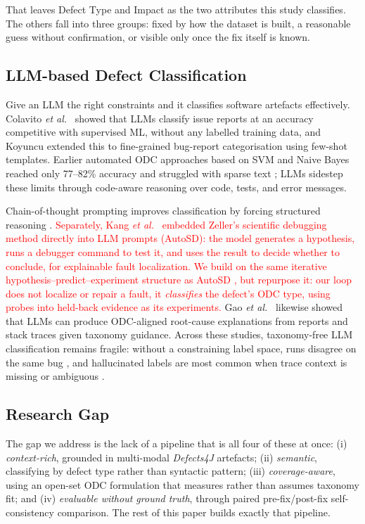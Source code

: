 That leaves Defect Type and Impact as the two attributes this study
classifies. The others fall into three groups: fixed by how the dataset is
built, a reasonable guess without confirmation, or visible only once the
fix itself is known.

\subsection{LLM-based Defect Classification}

Give an LLM the right constraints and it classifies software artefacts
effectively. Colavito \textit{et al.}\ \citep{colavito2024llm} showed that LLMs
classify issue reports at an accuracy competitive with supervised ML, without
any labelled training data, and Koyuncu \citep{koyuncu2025exploring} extended
this to fine-grained bug-report categorisation using few-shot templates. Earlier
automated ODC approaches based on SVM and Naive Bayes reached only 77--82\%
accuracy and struggled with sparse text
\citep{huang2011autoodc,thung2012automatic}; LLMs sidestep these limits through
code-aware reasoning over code, tests, and error messages.

Chain-of-thought prompting improves classification by forcing structured
reasoning \citep{nong2024cot}. \textcolor{red}{Separately, Kang \textit{et al.}\
\citep{kang2023autosd} embedded Zeller's scientific debugging method
\citep{zeller2009why} directly into LLM prompts (AutoSD): the model generates a
hypothesis, runs a debugger command to test it, and uses the result to decide
whether to conclude, for explainable fault localization. We build on the same
iterative hypothesis--predict--experiment structure as AutoSD
\citep{kang2023autosd}, but repurpose it: our loop does not localize or repair
a fault, it \emph{classifies} the defect's ODC type, using probes into
held-back evidence as its experiments.} Gao \textit{et al.}\ \citep{gao2024rcegen} likewise showed that
LLMs can produce ODC-aligned root-cause explanations from reports and stack
traces given taxonomy guidance. Across these studies, taxonomy-free LLM
classification remains fragile: without a constraining label space, runs disagree
on the same bug \citep{koyuncu2025exploring}, and hallucinated labels are most
common when trace context is missing or ambiguous \citep{gao2024rcegen}.



\subsection{Research Gap}

The gap we address is the lack of a pipeline that is all four of these at once:
(i) \emph{context-rich}, grounded in multi-modal \textit{Defects4J} artefacts;
(ii) \emph{semantic}, classifying by defect type rather than syntactic
pattern; (iii) \emph{coverage-aware}, using an open-set ODC formulation that
measures rather than assumes taxonomy fit; and (iv) \emph{evaluable without
ground truth}, through paired pre-fix/post-fix self-consistency comparison. The
rest of this paper builds exactly that pipeline.

